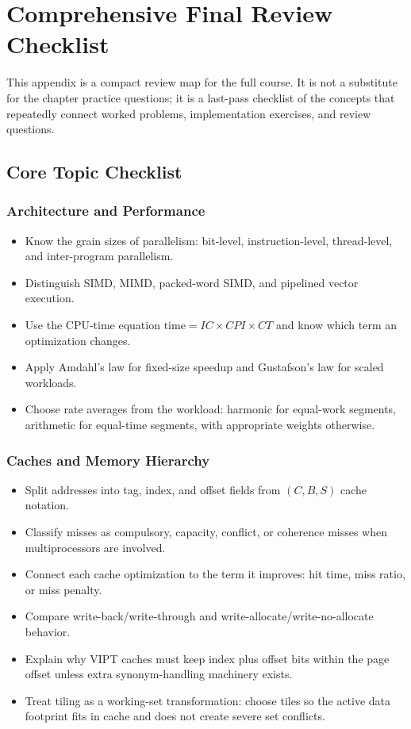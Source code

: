 \chapter{Comprehensive Final Review Checklist}\label{ch:final-review-checklist}
This appendix is a compact review map for the full course.
It is not a substitute for the chapter practice questions; it is a last-pass checklist of the concepts that repeatedly connect worked problems, implementation exercises, and review questions.


\section{Core Topic Checklist}\label{sec:app-e-core-checklist}

\subsection*{Architecture and Performance}
\begin{itemize}
    \item Know the grain sizes of parallelism: bit-level, instruction-level, thread-level, and inter-program parallelism.
    \item Distinguish SIMD, MIMD, packed-word SIMD, and pipelined vector execution.
    \item Use the CPU-time equation $\text{time}=IC\times CPI\times CT$ and know which term an optimization changes.
    \item Apply Amdahl's law for fixed-size speedup and Gustafson's law for scaled workloads.
    \item Choose rate averages from the workload: harmonic for equal-work segments, arithmetic for equal-time segments, with appropriate weights otherwise.
\end{itemize}

\subsection*{Caches and Memory Hierarchy}
\begin{itemize}
    \item Split addresses into tag, index, and offset fields from $(C,B,S)$ cache notation.
    \item Classify misses as compulsory, capacity, conflict, or coherence misses when multiprocessors are involved.
    \item Connect each cache optimization to the term it improves: hit time, miss ratio, or miss penalty.
    \item Compare write-back/write-through and write-allocate/write-no-allocate behavior.
    \item Explain why VIPT caches must keep index plus offset bits within the page offset unless extra synonym-handling machinery exists.
    \item Treat tiling as a working-set transformation: choose tiles so the active data footprint fits in cache and does not create severe set conflicts.
\end{itemize}

